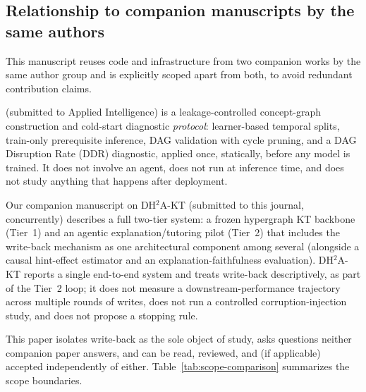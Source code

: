\documentclass[review,12pt]{elsarticle}
\begin{document}
\subsection{Relationship to companion manuscripts by the same authors}
\label{sec:relationship}

This manuscript reuses code and infrastructure from two companion works
by the same author group and is explicitly scoped apart from both, to
avoid redundant contribution claims.

\cite{daominh2026p0} (submitted to Applied Intelligence) is a
leakage-controlled concept-graph construction and cold-start diagnostic
\emph{protocol}: learner-based temporal splits, train-only prerequisite
inference, DAG validation with cycle pruning, and a DAG Disruption Rate
(DDR) diagnostic, applied once, statically, before any model is trained.
It does not involve an agent, does not run at inference time, and does
not study anything that happens after deployment.

Our companion manuscript on DH$^2$A-KT (submitted to this journal,
concurrently) describes a full two-tier system: a frozen hypergraph KT
backbone (Tier~1) and an agentic explanation/tutoring pilot (Tier~2)
that includes the write-back mechanism as one architectural component
among several (alongside a causal hint-effect estimator and an
explanation-faithfulness evaluation). DH$^2$A-KT reports a single
end-to-end system and treats write-back descriptively, as part of the
Tier~2 loop; it does not measure a downstream-performance trajectory
across multiple rounds of writes, does not run a controlled
corruption-injection study, and does not propose a stopping rule.

This paper isolates write-back as the sole object of study, asks
questions neither companion paper answers, and can be read, reviewed,
and (if applicable) accepted independently of either. Table~\ref{tab:scope-comparison}
summarizes the scope boundaries.
\end{document}
